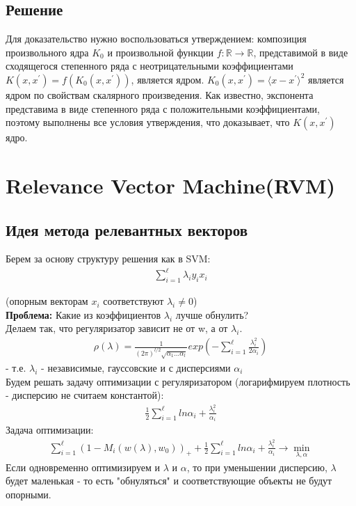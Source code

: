 \subsection{Решение}

Для доказательство нужно воспользоваться утверждением: композиция произвольного ядра $K_0$ и произвольной функции
$f: \mathbb{R} \rightarrow \mathbb{R}$, представимой в виде сходящегося степенного ряда с неотрицательными коэффициентами
$K\left(x, x^{\prime}\right)=f\left(K_0\left(x, x^{\prime}\right)\right)$, является ядром.
$K_0(x, x^{\prime}) = \langle x - x^{\prime} \rangle^2$ является ядром по свойствам скалярного произведения. Как известно,
экспонента представима в виде степенного ряда с положительными коэффициентами, поэтому выполнены все условия утверждения, что
доказывает, что $K(x, x^{\prime})$ ядро.


\section{Relevance Vector Machine(RVM)}

\subsection{Идея метода релевантных векторов}

Берем за основу структуру решения как в SVM:\\
\begin{align*}
   \sum_{i=1}^{\ell} \lambda_i y_i x_i
\end{align*}

(опорным векторам $x_i$ соответствуют $\lambda_i \neq 0$) \\
\textbf{Проблема:} Какие из коэффициентов $\lambda_i$ лучше обнулить? \\
Делаем так, что регуляризатор зависит не от w, а от $\lambda_i$. \\
\begin{align*}
       \rho (\lambda) = \frac{1}{(2\pi)^{l/2} \sqrt{\alpha_1...\alpha_l}} exp(-\sum_{i=1}^{\ell} \frac{\lambda_i^2}{2\alpha_i})
\end{align*}
- т.е. $\lambda_i$ - независимые, гауссовские и с дисперсиями $\alpha_i$ \\
Будем решать задачу оптимизации с регуляризатором (логарифмируем плотность - дисперсию не считаем константой): \\
\begin{align*}
       \frac{1}{2} \sum_{i=1}^{\ell} ln\alpha_i + \frac{\lambda_i^2}{\alpha_i}
\end{align*} 
Задача оптимизации:  \\
\begin{align*}
       \sum_{i=1}^{\ell} (1 - M_i(w(\lambda), w_0))_+ + \frac{1}{2} \sum_{i=1}^{\ell} ln\alpha_i + \frac{\lambda_i^2}{\alpha_i} \rightarrow \min_{\lambda, \alpha}
\end{align*}
Если одновременно оптимизируем и $\lambda$ и $\alpha$, то при уменьшении дисперсию, $\lambda$ будет маленькая - то есть "обнуляться" и соответствующие объекты не будут опорными. 


